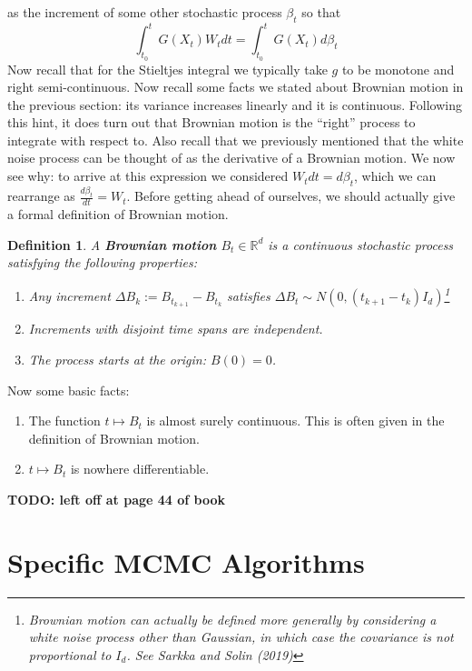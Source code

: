 \documentclass[12pt]{article}
\newcommand{\R}{\mathcal{R}}
\def\R{\mathbb{R}}
\newtheorem{definition}{Definition}
\begin{document}
as the increment of some other stochastic process $\beta_t$ so that 
\[\int_{t_0}^{t} G(X_t) W_t dt = \int_{t_0}^{t} G(X_t) d\beta_t \]
Now recall that for the Stieltjes integral we typically take $g$ to be monotone and right semi-continuous. Now recall some facts we stated about Brownian motion in 
the previous section: its variance increases linearly and it is continuous. Following this hint, it does turn out that Brownian motion is the ``right'' process to integrate with 
respect to. Also recall that we previously mentioned that the white noise process can be thought of as the derivative of a Brownian motion. We now see why: 
to arrive at this expression we considered $W_t dt = d\beta_t$, which we can rearrange as $\frac{d\beta_t}{dt} = W_t$. 
Before getting ahead of ourselves, we should actually give a formal definition of Brownian motion. 
\begin{definition}
A \textbf{Brownian motion} $B_t \in \R^d$ is a continuous stochastic process satisfying the following properties: 
\begin{enumerate} 
\item Any increment $\Delta B_k := B_{t_{k + 1}} - B_{t_k}$ satisfies $\Delta B_t \sim N(0, (t_{k + 1} - t_{k})I_d)$\footnote{Brownian motion can actually be defined more generally 
by considering a white noise process other than Gaussian, in which case the covariance is not proportional to $I_d$. See Sarkka and Solin (2019)}
\item Increments with disjoint time spans are independent. 
\item The process starts at the origin: $B(0) = 0$. 
\end{enumerate}
\end{definition}

Now some basic facts: 
\begin{enumerate}
\item The function $t \mapsto B_t$ is almost surely continuous. This is often given in the definition of Brownian motion. 
\item $t \mapsto B_t$ is nowhere differentiable.  
\end{enumerate}

\textbf{TODO: left off at page 44 of book}


\section{Specific MCMC Algorithms}

\end{document}
